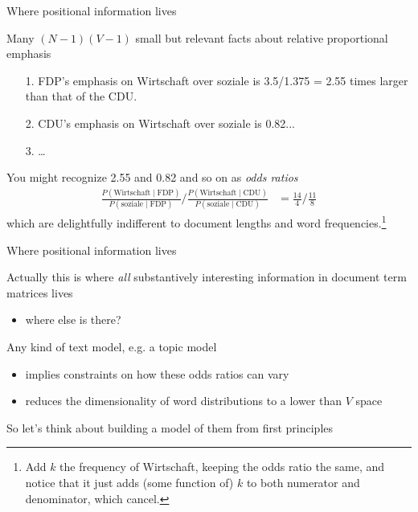 \documentclass{hertieteaching}
\begin{document}
\begin{frame}{Where positional information lives}

Many $(N-1)(V-1)$ small but relevant facts about relative proportional emphasis
\begin{itemize}
\item[1.] FDP's emphasis on Wirtschaft over soziale is 3.5/1.375 = 2.55 times larger than that of the CDU.  
\item[2.] CDU's emphasis on Wirtschaft over soziale is 0.82...
\item[3.] \ldots
\end{itemize}

You might recognize 2.55 and 0.82 and so on as \textit{odds ratios}
\begin{align*}
\frac{P(\text{Wirtschaft} \mid \text{FDP})} 
     {P(\text{soziale} \mid \text{FDP})} \bigg/
\frac{P(\text{Wirtschaft} \mid \text{CDU})} 
     {P(\text{soziale} \mid \text{CDU})}     & = \frac{14}{4} \bigg/ \frac{11}{8} 
\end{align*}
which are delightfully indifferent to document lengths and word frequencies.\footnote{Add $k$ the frequency of Wirtschaft, keeping the odds ratio the same, and notice that it just adds (some function of) $k$ to both numerator and denominator, which cancel.}


\end{frame}
\begin{frame}{Where positional information lives}


Actually this is where \textit{all} substantively interesting information in document term matrices lives
\begin{itemize}
  \item where else is there?
\end{itemize}

Any kind of text model, e.g. a topic model
\begin{itemize}
  \item implies constraints on how these odds ratios can vary
  \item reduces the dimensionality of word distributions to a lower than $V$ space
\end{itemize}


\bigskip
So let's think about building a model of them from first principles

\end{frame}
\end{document}
